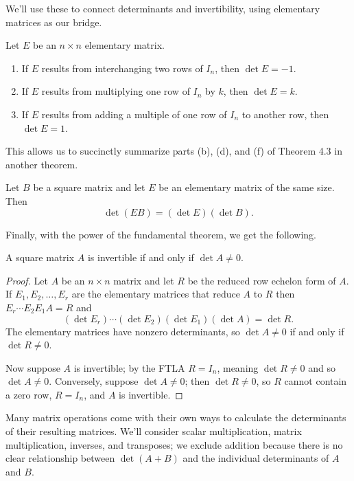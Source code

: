 \documentclass[../m073main.tex]{subfiles}
\begin{document}
We'll use these to connect determinants and invertibility, using elementary matrices as our bridge.

\begin{theorem}
	Let $E$ be an $n \times n$ elementary matrix.
	\begin{enumerate}[label=(\alph*)]
		\item If $E$ results from interchanging two rows of $I_n$, then $\det E = -1$.
		\item If $E$ results from multiplying one row of $I_n$ by $k$, then $\det E = k$.
		\item If $E$ results from adding a multiple of one row of $I_n$ to another row, then $\det E = 1$.
	\end{enumerate}
\end{theorem}

This allows us to succinctly summarize parts (b), (d), and (f) of Theorem 4.3 in another theorem.

\begin{lemma}
	Let $B$ be a square matrix and let $E$ be an elementary matrix of the same size.
	Then
	\[ \det (EB) = (\det E)(\det B). \]
\end{lemma}

Finally, with the power of the fundamental theorem, we get the following.

\begin{theorem}
	A square matrix $A$ is invertible if and only if $\det A \neq 0$.
\end{theorem}

\begin{proof}
	Let $A$ be an $n \times n$ matrix and let $R$ be the reduced row echelon form of $A$.
	If $E_1, E_2, \ldots, E_r$ are the elementary matrices that reduce $A$ to $R$ then $E_r \cdots E_2 E_1 A = R$ and
	\[ (\det E_r) \cdots (\det E_2) (\det E_1) (\det A) = \det R. \]
	The elementary matrices have nonzero determinants, so $\det A \neq 0$ if and only if $\det R \neq 0$.

	Now suppose $A$ is invertible; by the FTLA $R = I_n$, meaning $\det R \neq 0$ and so $\det A \neq 0$.
	Conversely, suppose $\det A \neq 0$; then $\det R \neq 0$, so $R$ cannot contain a zero row, $R = I_n$, and $A$ is invertible.
\end{proof}

Many matrix operations come with their own ways to calculate the determinants of their resulting matrices.
We'll consider scalar multiplication, matrix multiplication, inverses, and transposes; we exclude addition because there is no clear relationship between $\det (A + B)$ and the individual determinants of $A$ and $B$.
\end{document}
